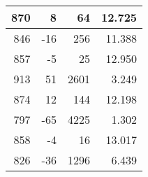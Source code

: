 \begin{longtable}{|r|r|r|r|}
	870                                                                                             & 8                                                 & 64                                                   & 12.725                                                                                         \\ \hline
	846                                                                                             & -16                                               & 256                                                  & 11.388                                                                                         \\ \hline
	857                                                                                             & -5                                                & 25                                                   & 12.950                                                                                         \\ \hline
	913                                                                                             & 51                                                & 2601                                                 & 3.249                                                                                          \\ \hline
	874                                                                                             & 12                                                & 144                                                  & 12.198                                                                                         \\ \hline
	797                                                                                             & -65                                               & 4225                                                 & 1.302                                                                                          \\ \hline
	858                                                                                             & -4                                                & 16                                                   & 13.017                                                                                         \\ \hline
	826                                                                                             & -36                                               & 1296                                                 & 6.439                                                                                          \\ \hline

\end{longtable}
